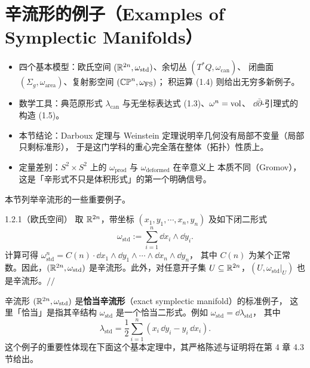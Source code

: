 \section{辛流形的例子（Examples of Symplectic Manifolds）}

\begin{keytakeaways}
\begin{itemize}
  \item 四个基本模型：欧氏空间 $(\mathbb{R}^{2n},\omega_{\mathrm{std}})$、余切丛 $(T^*Q,\omega_{\mathrm{can}})$、
        闭曲面 $(\Sigma_g,\omega_{\mathrm{area}})$、复射影空间 $(\mathbb{CP}^n,\omega_{\mathrm{FS}})$；
        积运算 (1.4) 则给出无穷多新例子。
  \item 数学工具：典范原形式 $\lambda_{\mathrm{can}}$ 与无坐标表达式 (1.3)、$\omega^n=\operatorname{vol}$、
        $\dd\bar\partial$-引理式的构造 (1.5)。
  \item 本节结论：Darboux 定理与 Weinstein 定理说明辛几何没有局部不变量（局部只剩标准形），
        于是这门学科的重心完全落在整体（拓扑）性质上。
  \item 定量差别：$S^2\times S^2$ 上的 $\omega_{\mathrm{prod}}$ 与 $\omega_{\mathrm{deformed}}$ 在辛意义上
        本质不同（Gromov），这是「辛形式不只是体积形式」的第一个明确信号。
\end{itemize}
\end{keytakeaways}

本节列举辛流形的一些重要例子。

\begin{wexam}{1.2.1}（欧氏空间）
取 $\mathbb{R}^{2n}$，带坐标 $(x_1,y_1,\cdots,x_n,y_n)$ 及如下闭二形式
\begin{equation}
  \omega_{\mathrm{std}}:=\sum_{i=1}^{n}\dd x_i\wedge\dd y_i .
  \tag{1.1}
\end{equation}
计算可得 $\omega_{\mathrm{std}}^n=C(n)\cdot\dd x_1\wedge\dd y_1\wedge\cdots\wedge\dd x_n\wedge\dd y_n$，
其中 $C(n)$ 为某个正常数。因此，$(\mathbb{R}^{2n},\omega_{\mathrm{std}})$ 是辛流形。此外，对任意开子集
$U\subseteq\mathbb{R}^{2n}$，$(U,\omega_{\mathrm{std}}|_U)$ 也是辛流形。\hfill$//$
\end{wexam}

辛流形 $(\mathbb{R}^{2n},\omega_{\mathrm{std}})$ 是\textbf{恰当辛流形}（exact symplectic manifold）的标准例子，
这里「恰当」是指其辛结构 $\omega_{\mathrm{std}}$ 是一个恰当二形式。例如 $\omega_{\mathrm{std}}=\dd\lambda_{\mathrm{std}}$，
其中
\[
  \lambda_{\mathrm{std}}=\frac{1}{2}\sum_{i=1}^{n}(x_i\,\dd y_i-y_i\,\dd x_i).
\]
这个例子的重要性体现在下面这个基本定理中，其严格陈述与证明将在第 4 章 4.3 节给出。


